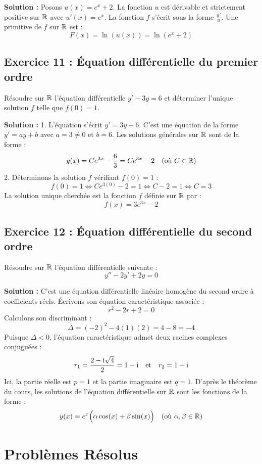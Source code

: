 \textbf{Solution :}
Posons $u(x) = e^x + 2$. La fonction $u$ est dérivable et strictement positive sur $\mathbb{R}$ avec $u'(x) = e^x$.
La fonction $f$ s'écrit sous la forme $\frac{u'}{u}$.
Une primitive de $f$ sur $\mathbb{R}$ est :
\[
F(x) = \ln(u(x)) = \ln(e^x + 2)
\]

\subsection*{Exercice 11 : Équation différentielle du premier ordre}
Résoudre sur $\mathbb{R}$ l'équation différentielle $y' - 3y = 6$ et déterminer l'unique solution $f$ telle que $f(0) = 1$.

\textbf{Solution :}
1. L'équation s'écrit $y' = 3y + 6$. C'est une équation de la forme $y' = ay + b$ avec $a=3 \ne 0$ et $b=6$.
   Les solutions générales sur $\mathbb{R}$ sont de la forme :
   \[
   y(x) = C e^{3x} - \frac{6}{3} = C e^{3x} - 2 \quad (\text{où } C \in \mathbb{R})
   \]
2. Déterminons la solution $f$ vérifiant $f(0) = 1$ :
   \[
   f(0) = 1 \iff C e^{3(0)} - 2 = 1 \iff C - 2 = 1 \iff C = 3
   \]
La solution unique cherchée est la fonction $f$ définie sur $\mathbb{R}$ par :
\[
f(x) = 3 e^{3x} - 2
\]

\subsection*{Exercice 12 : Équation différentielle du second ordre}
Résoudre sur $\mathbb{R}$ l'équation différentielle suivante :
\[
y'' - 2y' + 2y = 0
\]

\textbf{Solution :}
C'est une équation différentielle linéaire homogène du second ordre à coefficients réels.
Écrivons son équation caractéristique associée :
\[
r^2 - 2r + 2 = 0
\]
Calculons son discriminant :
\[
\Delta = (-2)^2 - 4(1)(2) = 4 - 8 = -4
\]
Puisque $\Delta < 0$, l'équation caractéristique admet deux racines complexes conjuguées :
\[
r_1 = \frac{2 - \mathrm{i}\sqrt{4}}{2} = 1 - \mathrm{i} \quad \text{et} \quad r_2 = 1 + \mathrm{i}
\]
Ici, la partie réelle est $p = 1$ et la partie imaginaire est $q = 1$.
D'après le théorème du cours, les solutions de l'équation différentielle sur $\mathbb{R}$ sont les fonctions de la forme :
\[
y(x) = e^x \Big( \alpha \cos(x) + \beta \sin(x) \Big) \quad (\text{où } \alpha, \beta \in \mathbb{R})
\]

\section{Problèmes Résolus}

